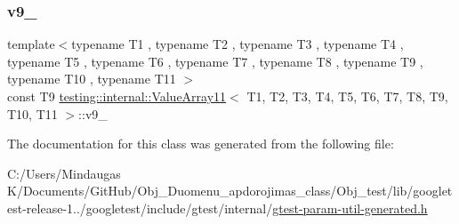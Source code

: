 \subsubsection{\texorpdfstring{v9\_}{v9\_}}
{\footnotesize\ttfamily template$<$typename T1 , typename T2 , typename T3 , typename T4 , typename T5 , typename T6 , typename T7 , typename T8 , typename T9 , typename T10 , typename T11 $>$ \\
const T9 \mbox{\hyperlink{classtesting_1_1internal_1_1_value_array11}{testing\+::internal\+::\+Value\+Array11}}$<$ T1, T2, T3, T4, T5, T6, T7, T8, T9, T10, T11 $>$\+::v9\+\_\+\hspace{0.3cm}{\ttfamily [private]}}



The documentation for this class was generated from the following file\+:\begin{DoxyCompactItemize}
\item 
C\+:/\+Users/\+Mindaugas K/\+Documents/\+Git\+Hub/\+Obj\+\_\+\+Duomenu\+\_\+apdorojimas\+\_\+class/\+Obj\+\_\+test/lib/googletest-\/release-\/1../googletest/include/gtest/internal/\mbox{\hyperlink{gtest-param-util-generated_8h}{gtest-\/param-\/util-\/generated.\+h}}\end{DoxyCompactItemize}
